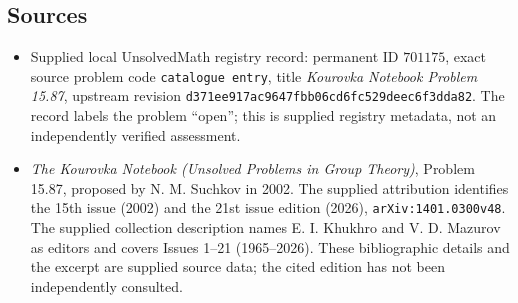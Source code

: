\documentclass[11pt]{article}
\begin{document}
\subsection{Sources}
\begin{itemize}
\item Supplied local UnsolvedMath registry record: permanent ID \(701175\), exact source problem code \texttt{catalogue entry}, title \emph{Kourovka Notebook Problem 15.87}, upstream revision \texttt{d371ee917ac9647fbb06cd6fc529deec6f3dda82}. The record labels the problem ``open''; this is supplied registry metadata, not an independently verified assessment.
\item \emph{The Kourovka Notebook (Unsolved Problems in Group Theory)}, Problem 15.87, proposed by N. M. Suchkov in 2002. The supplied attribution identifies the 15th issue (2002) and the 21st issue edition (2026), \texttt{arXiv:1401.0300v48}. The supplied collection description names E. I. Khukhro and V. D. Mazurov as editors and covers Issues 1--21 (1965--2026). These bibliographic details and the excerpt are supplied source data; the cited edition has not been independently consulted.
\end{itemize}
\end{document}
